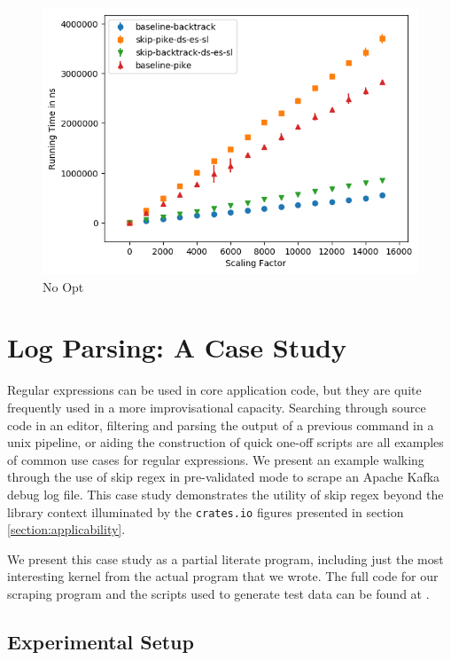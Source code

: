 \begin{figure}
\caption{No Opt}
\label{fig:justtwo:branch}

\includegraphics{resources/justtwo-branch.png}
\end{figure}

\section{Log Parsing: A Case Study}
\label{section:logparsingcase}

Regular expressions can be used in core application code, but they
are quite frequently used in a more improvisational capacity.
Searching through source code in an editor, filtering and parsing
the output of a previous command in a unix pipeline, or aiding
the construction of quick one-off scripts are all examples of
common use cases for regular expressions. We present an example
walking through the use of skip regex in pre-validated mode
to scrape an Apache Kafka debug log file. This case study
demonstrates the utility of skip regex beyond the library context
illuminated by the \verb'crates.io' figures presented in section
\ref{section:applicability}.

We present this case study as a partial literate program,
including just the most interesting kernel from the actual
program that we wrote. The full code for our scraping program
and the scripts used to generate test data can be found at
\cite{PailesSkipRegexCaseStudy}.

\subsection{Experimental Setup}

